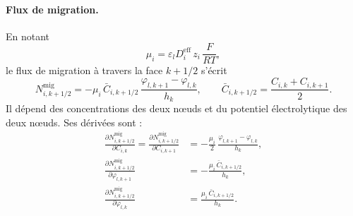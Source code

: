 \paragraph{Flux de migration.} En notant
\begin{equation*}
\mu_i = \varepsilon_l D_i^{\mathrm{eff}}\, z_i\,\frac{F}{RT} ,
\end{equation*}
le flux de migration à travers la face $k+1/2$ s'écrit
\begin{equation*}
N^{\mathrm{mig}}_{i,k+1/2}
= -\mu_i\,\bar{C}_{i,k+1/2}\,\frac{\varphi_{l,k+1} - \varphi_{l,k}}{h_k},
\qquad
\bar{C}_{i,k+1/2} = \frac{C_{i,k} + C_{i,k+1}}{2} .
\end{equation*}
Il dépend des concentrations des deux nœuds et du potentiel électrolytique
des deux nœuds. Ses dérivées sont :
\begin{align*}
\frac{\partial N^{\mathrm{mig}}_{i,k+1/2}}{\partial C_{i,k}}
= \frac{\partial N^{\mathrm{mig}}_{i,k+1/2}}{\partial C_{i,k+1}}
&= -\frac{\mu_i}{2}\,\frac{\varphi_{l,k+1} - \varphi_{l,k}}{h_k} ,\\[0.2cm]
\frac{\partial N^{\mathrm{mig}}_{i,k+1/2}}{\partial \varphi_{l,k+1}}
&= -\frac{\mu_i\,\bar{C}_{i,k+1/2}}{h_k} ,\\[0.2cm]
\frac{\partial N^{\mathrm{mig}}_{i,k+1/2}}{\partial \varphi_{l,k}}
&= \frac{\mu_i\,\bar{C}_{i,k+1/2}}{h_k} .
\end{align*}

